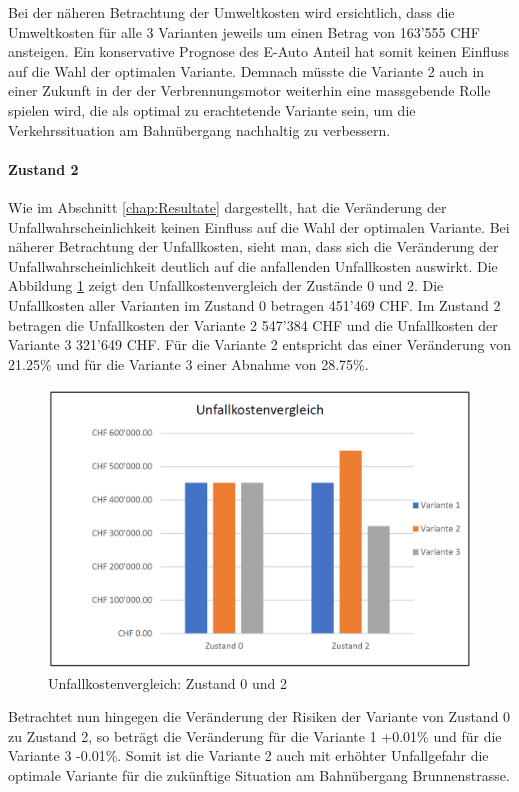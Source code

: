 Bei der näheren Betrachtung der Umweltkosten wird ersichtlich, dass die Umweltkosten für alle 3 Varianten jeweils um einen Betrag von 163'555 CHF ansteigen. 
Ein konservative Prognose des E-Auto Anteil hat somit keinen Einfluss auf die Wahl der optimalen Variante. Demnach müsste die Variante 2 auch in einer Zukunft in der der Verbrennungsmotor weiterhin eine massgebende Rolle spielen wird, die als optimal zu erachtetende Variante sein, um die Verkehrssituation am Bahnübergang nachhaltig zu verbessern.


\paragraph{Zustand 2} 

Wie im Abschnitt \ref{chap:Resultate} dargestellt, hat die Veränderung der Unfallwahrscheinlichkeit keinen Einfluss auf die Wahl der optimalen Variante. 
Bei näherer Betrachtung der Unfallkosten, sieht man, dass sich die Veränderung der Unfallwahrscheinlichkeit deutlich auf die anfallenden Unfallkosten auswirkt. 
Die Abbildung \ref{img:UnfallVer.Z0-2} zeigt den Unfallkostenvergleich der Zustände 0 und 2. Die Unfallkosten aller Varianten im Zustand 0 betragen 451'469 CHF. Im Zustand 2 betragen die Unfallkosten der Variante 2 547'384 CHF und die Unfallkosten der Variante 3 321'649 CHF. Für die Variante 2 entspricht das einer Veränderung von 21.25\% und für die Variante 3 einer Abnahme von 28.75\%. 

\begin{figure}[h!]
	\centering
	\includegraphics[width=.45\textwidth]{figures/f-06-03-Unfallkostenvergleich-Z0-Z2}
	\caption[Unfallkostenvergleich: Zustand 0 und 2]{Unfallkostenvergleich: Zustand 0 und 2}
	\label{img:UnfallVer.Z0-2}
\end{figure}

Betrachtet nun hingegen die Veränderung der Risiken der Variante von Zustand 0 zu Zustand 2, so beträgt die Veränderung für die Variante 1 +0.01\% und für die Variante 3 -0.01\%. 
Somit ist die Variante 2 auch mit erhöhter Unfallgefahr die optimale Variante für die zukünftige Situation am Bahnübergang Brunnenstrasse. 
 

